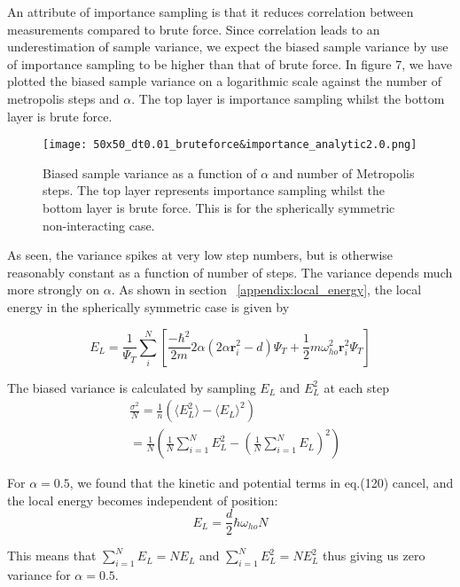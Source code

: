 \documentclass[
    a4paper, aps, twocolumn, floatfix, superscriptaddress,
    nofootinbib]{revtex4-1}
\begin{document}
\begin{appendices}
An attribute of importance sampling is that it reduces correlation between measurements compared to brute force. Since correlation leads to an underestimation of sample variance, we expect the biased sample variance by use of importance sampling to be higher than that of brute force. In figure 7, we have plotted the biased sample variance on a logarithmic scale against the number of metropolis steps and $\alpha$. The top layer is importance sampling whilst the bottom layer is brute force.

\begin{figure}[H]
    \centering
    \texttt{[image: 50x50\_dt0.01\_bruteforce\&importance\_analytic2.0.png]}
    \caption{Biased sample variance as a function of $\alpha$ and number of Metropolis steps. The top layer represents importance sampling whilst the bottom layer is brute force. This is for the spherically symmetric non-interacting case.}
    \label{fig:blocking_behaviour}
\end{figure}

As seen, the variance spikes at very low step numbers, but is otherwise reasonably constant as a function of number of steps. The variance depends much more strongly on $\alpha$. As shown in section ~\ref{appendix:local_energy}, the local energy in the spherically symmetric case is given by

\begin{equation}\label{eq:localenergy_alpha_pos}
    E_L = \frac{1}{\Psi_T} \sum_i^N \left[\frac{-\hbar^2}{2m} 2\alpha(2\alpha \boldsymbol{r}_i^2 - d) \Psi_T + \frac{1}{2}m \omega_{ho}^2 \boldsymbol{r}_i^2 \Psi_T\right]
\end{equation}

The biased variance is calculated by sampling $E_L$ and $E_L^2$ at each step
\begin{align}
    &\frac{\sigma^2}{N} = \frac{1}{n} \left(\langle E_L^2 \rangle - \langle E_L \rangle^2\right)\\
   & = \frac{1}{N} \left( \frac{1}{N}\sum_{i=1}^{N}E_L^2 - \left( \frac{1}{N}\sum_{i=1}^N E_L \right)^2\right)
\end{align}

For  $\alpha = 0.5$, we found that the kinetic and potential terms in eq.(120) cancel, and the local energy becomes independent of position:
\begin{equation}
    E_L = \frac{d}{2} \hbar \omega_{ho} N
\end{equation}

This means that  $\sum_{i=1}^{N} E_L = N E_L$ and $\sum_{i=1}^{N} E_L^2 = N E_L^2$ thus giving us zero variance for $\alpha =0.5$. 


\end{appendices}
\end{document}
